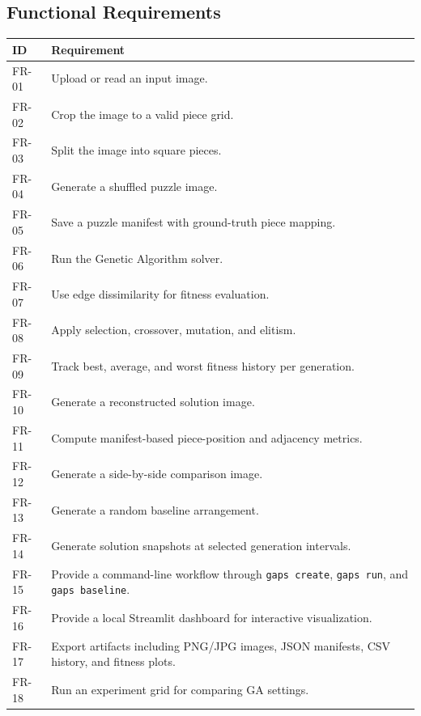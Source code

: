 \documentclass[12pt,a4paper]{article}
\begin{document}
\subsection{Functional Requirements}
\begin{longtable}{>{\raggedright\arraybackslash}p{}>{\raggedright\arraybackslash}p{}}
\toprule
\textbf{ID} & \textbf{Requirement} \\
\midrule
FR-01 & Upload or read an input image. \\
FR-02 & Crop the image to a valid piece grid. \\
FR-03 & Split the image into square pieces. \\
FR-04 & Generate a shuffled puzzle image. \\
FR-05 & Save a puzzle manifest with ground-truth piece mapping. \\
FR-06 & Run the Genetic Algorithm solver. \\
FR-07 & Use edge dissimilarity for fitness evaluation. \\
FR-08 & Apply selection, crossover, mutation, and elitism. \\
FR-09 & Track best, average, and worst fitness history per generation. \\
FR-10 & Generate a reconstructed solution image. \\
FR-11 & Compute manifest-based piece-position and adjacency metrics. \\
FR-12 & Generate a side-by-side comparison image. \\
FR-13 & Generate a random baseline arrangement. \\
FR-14 & Generate solution snapshots at selected generation intervals. \\
FR-15 & Provide a command-line workflow through \texttt{gaps create}, \texttt{gaps run}, and \texttt{gaps baseline}. \\
FR-16 & Provide a local Streamlit dashboard for interactive visualization. \\
FR-17 & Export artifacts including PNG/JPG images, JSON manifests, CSV history, and fitness plots. \\
FR-18 & Run an experiment grid for comparing GA settings. \\
\bottomrule
\end{longtable}
\end{document}

